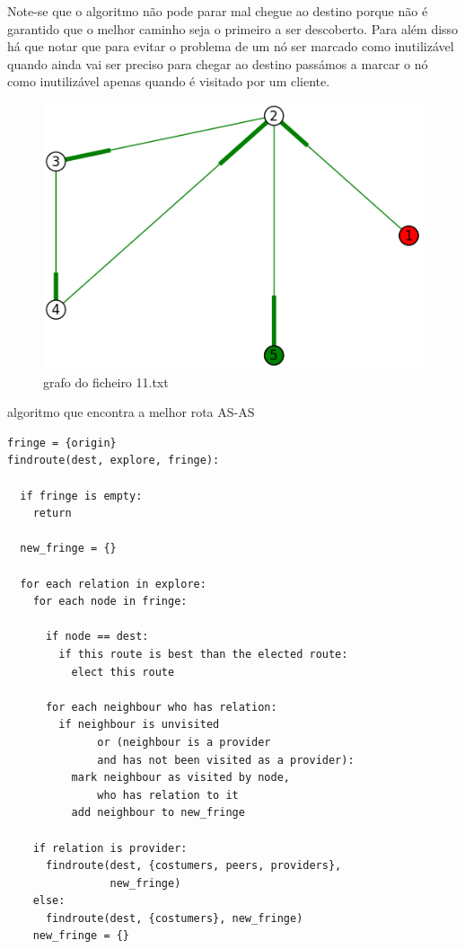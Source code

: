 \documentclass[10pt,a4paper]{article}
\begin{document}
Note-se que o algoritmo não pode parar mal chegue ao destino porque não é garantido que o melhor caminho seja o primeiro a ser descoberto. Para além disso há que notar que para evitar o problema de um nó ser marcado como inutilizável quando ainda vai ser preciso para chegar ao destino passámos a marcar o nó como inutilizável apenas quando é visitado por um cliente.

\begin{figure}[h]
\centering
\includegraphics[scale=0.5]{11}
\caption{grafo do ficheiro 11.txt}
\label{fig:11}
\end{figure}


\begin{algorithm}[H]
\caption{algoritmo que encontra a melhor rota AS-AS}
\label{algo:findroute}
\begin{lstlisting}
fringe = {origin}
findroute(dest, explore, fringe):

  if fringe is empty:
    return

  new_fringe = {}

  for each relation in explore:
    for each node in fringe:

      if node == dest:
        if this route is best than the elected route:
          elect this route

      for each neighbour who has relation:
        if neighbour is unvisited
              or (neighbour is a provider
              and has not been visited as a provider):
          mark neighbour as visited by node,
              who has relation to it
          add neighbour to new_fringe

    if relation is provider:
      findroute(dest, {costumers, peers, providers},
                new_fringe)
    else:
      findroute(dest, {costumers}, new_fringe)
    new_fringe = {}
\end{lstlisting}

\end{algorithm}
\end{document}
